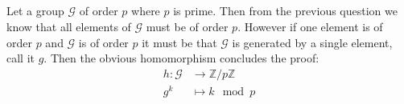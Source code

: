 \documentclass[10pt,a4paper]{book}
\begin{document}
\subsection{}
Let a group $\mathcal{G}$ of order $p$ where $p$ is prime. Then from the previous question we know that all elements of $\mathcal{G}$ must be of order $p$. However if one element is of order $p$ and $\mathcal{G}$ is of order $p$ it must be that $\mathcal{G}$ is generated by a single element, call it $g$. Then the obvious homomorphism concludes the proof:
\begin{align*}
h : \mathcal{G} &\to \mathbb{Z}/p\mathbb{Z}\\
g^k &\mapsto k \mod p
\end{align*}
\end{document}
